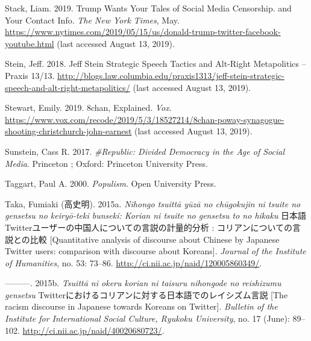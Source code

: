 \documentclass[10pt,british,A4paper,oneside]{memoir}
\begin{document}
\hypertarget{ref-stack_trump_2019}{}
Stack, Liam. 2019. Trump Wants Your Tales of Social Media Censorship.
and Your Contact Info. \emph{The New York Times}, May.
\url{https://www.nytimes.com/2019/05/15/us/donald-trump-twitter-facebook-youtube.html} (last accessed August 13, 2019).

\hypertarget{ref-stein_jeff_2018}{}
Stein, Jeff. 2018. Jeff Stein Strategic Speech Tactics and Alt-Right
Metapolitics -- Praxis 13/13.
\url{http://blogs.law.columbia.edu/praxis1313/jeff-stein-strategic-speech-and-alt-right-metapolitics/} (last accessed August 13, 2019).

\hypertarget{ref-stewart_8chan_2019}{}
Stewart, Emily. 2019. 8chan, Explained. \emph{Vox}.
\url{https://www.vox.com/recode/2019/5/3/18527214/8chan-poway-synagogue-shooting-christchurch-john-earnest} (last accessed August 13, 2019).

\hypertarget{ref-sunstein_republic:_2017}{}
Sunstein, Cass R. 2017. \emph{\#Republic: Divided Democracy in the Age
of Social Media}. Princeton ; Oxford: Princeton University Press.

\hypertarget{ref-taggart_populism_2000}{}
Taggart, Paul A. 2000. \emph{Populism}. Open University Press.

\hypertarget{ref-taka_twitter_2015}{}
Taka, Fumiaki (高史明). 2015a.
\emph{Nihongo tsuittā yūzā no chūgokujin ni tsuite no gensetsu no keiryō-teki bunseki: Korian ni tsuite no gensetsu to no hikaku} 日本語Twitterユーザーの中国人についての言説の計量的分析 : コリアンについての言説との比較 [Quantitative analysis of discourse about Chinese by Japanese Twitter users: comparison with discourse about Koreans]. \emph{Journal of the Institute of Humanities}, no. 53: 73--86.
\url{http://ci.nii.ac.jp/naid/120005860349/}.

\hypertarget{ref-taka_twitter_2015-1}{}
---------. 2015b.
\emph{Tsuittā ni okeru korian ni taisuru nihongode no reishizumu gensetsu} Twitterにおけるコリアンに対する日本語でのレイシズム言説 [The racism discourse in Japanese towards Koreans on Twitter].
\emph{Bulletin of the Institute for International Social Culture, Ryukoku University}, no. 17 (June): 89--102.
\url{http://ci.nii.ac.jp/naid/40020680723/}.
\end{document}
